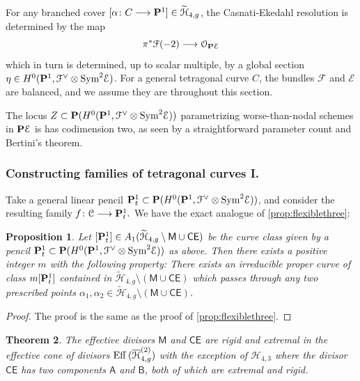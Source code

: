 \documentclass[reqno, 10 pt]{article}
\newtheorem{thm}{Theorem}
\newtheorem{prop}[thm]{Proposition}
\theoremstyle{definition}
\theoremstyle{remark}
\numberwithin{equation}{section}
\numberwithin{thm}{section}
\numberwithin{prop}{section}
\numberwithin{lem}{section}
\numberwithin{cor}{section}
\numberwithin{conj}{section}
\numberwithin{defn}{section}
\renewcommand{\H}{\mathcal H}
\newcommand{\td}{\widetilde}
\renewcommand{\to}{\longrightarrow}
\newcommand{\sfA}{{\mathsf A}}
\newcommand{\sfB}{{\mathsf B}}
\newcommand{\sfCE}{{\mathsf {CE}}}
\newcommand{\sfM}{{\mathsf M}}
\newcommand{\cC}{{\mathcal C}}
\newcommand{\cE}{{\mathcal E}}
\newcommand{\cF}{{\mathcal F}}
\newcommand{\cO}{{\mathcal O}}
\renewcommand{\P}{{\bf P}}
\newcommand {\from}{{\colon}}
\renewcommand{\H}{{\mathcal{H}}}
\newcommand {\Eff}{{\rm Eff}\,}
\newcommand {\Sym}{{\rm Sym}}
\begin{document}
For any branched cover $[\alpha \from C \to \P^{1}] \in \td{\H}_{4,g}$, the Casnati-Ekedahl resolution is determined by the map 
\begin{equation}\label{CE4}
\pi^{*}\cF(-2) \to \cO_{\P \cE}
\end{equation}
which in turn is determined, up to scalar multiple, by a global section $\eta \in H^{0}(\P^{1}, \dual{\cF}\otimes \Sym^{2}\cE)$.  For a general tetragonal curve $C$, the bundles $\cF$ and $\cE$ are balanced, and we assume they are throughout this section. 

The locus $Z \subset \P(H^{0}(\P^{1}, \dual{\cF}\otimes \Sym^{2}\cE))$ parametrizing worse-than-nodal schemes in $\P \cE$ is has codimension two, as seen by a straightforward parameter count and Bertini's theorem. 

\subsubsection{Constructing families of tetragonal curves I.}  

Take a general linear pencil $\P^{1}_{t} \subset \P(H^{0}(\P^{1}, \dual{\cF}\otimes \Sym^{2}\cE))$, and consider the resulting family $f \from \cC \to \P^{1}_{t}.$ We have the exact analogue of \autoref{prop:flexiblethree}:

\begin{prop}\label{prop:flexiblefour}
Let $[\P^{1}_{t}] \in A_{1}(\td{\H}_{4,g} \setminus \sfM \cup \sfCE)$ be the curve class given by a pencil $\P^{1}_{t} \subset \P(H^{0}(\P^{1}, \dual{\cF}\otimes \Sym^{2}\cE))$ as above. Then there exists a positive integer $m$ with the following property: There exists an irreducible proper curve of class $m[\P^{1}_{t}]$ contained in $\td{\H}_{4,g} \setminus (\sfM \cup \sfCE)$ which passes through any two prescribed points $\alpha_{1}, \alpha_{2} \in \td{\H}_{4,g} \setminus (\sfM \cup \sfCE)$.  
\end{prop} 

\begin{proof} The proof is the same as the proof of \autoref{prop:flexiblethree}.
\end{proof}

\begin{thm}\label{thm:Extremal4}
The effective divisors $\sfM$ and $\sfCE$ are rigid and extremal in the effective cone of divisors $\Eff (\overline{\H}^{(2)}_{4,g})$ with the exception of $\H_{4,3}$ where the divisor $\sfCE$ has two components $\sfA$ and $\sfB$, both of which are extremal and rigid.
\end{thm}
\end{document}
